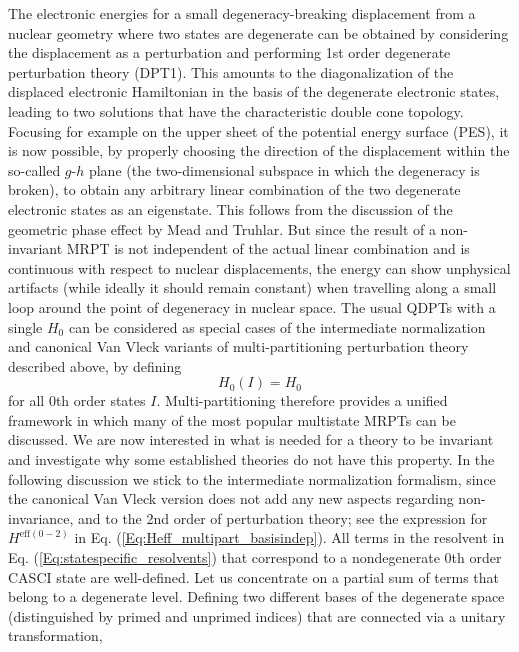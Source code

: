  The electronic energies for a small degeneracy-breaking displacement from a nuclear geometry where two states are degenerate can be obtained by considering the displacement as a perturbation and performing 1st order degenerate perturbation theory (DPT1). This amounts to the diagonalization of the displaced electronic Hamiltonian in the basis of the degenerate electronic states, leading to two solutions that have the characteristic double cone topology. Focusing for example on the upper sheet of the potential energy surface (PES), it is now possible, by properly choosing the direction of the displacement within the so-called $g$-$h$ plane\cite{Yarko_1998_511} (the two-dimensional subspace in which the degeneracy is broken), to obtain any arbitrary linear combination of the two degenerate electronic states as an eigenstate. This follows from the discussion of the geometric phase effect by Mead and Truhlar.\cite{MeadT_1979_2284} But since the result of a non-invariant MRPT is not independent of the actual linear combination and is continuous with respect to nuclear displacements, the energy can show unphysical artifacts (while ideally it should remain constant) when travelling along a small loop around the point of degeneracy in nuclear space.
The usual QDPTs with a single ${H_0}$ can be considered as special cases of the intermediate normalization and canonical Van Vleck variants of multi-partitioning perturbation theory described above, by defining
	\begin{equation}
	{H_0}(I) = {H_0}
	\end{equation}
for all 0th order states $I$. Multi-partitioning therefore provides a unified framework in which many of the most popular multistate MRPTs can be discussed. We are now interested in what is needed for a theory to be invariant and investigate why some established theories do not have this property. In the following discussion we stick to the intermediate normalization formalism, since the canonical Van Vleck version does not add any new aspects regarding non-invariance, and to the 2nd order of perturbation theory; see the expression for ${H^{{\text{eff}}(0 - 2)}}$ in Eq. (\ref{Eq:Heff_multipart_basisindep}).
All terms in the resolvent in Eq. (\ref{Eq:statespecific_resolvents}) that correspond to a nondegenerate 0th order CASCI state are well-defined. Let us concentrate on a partial sum of terms that belong to a degenerate level. Defining two different bases of the degenerate space (distinguished by primed and unprimed indices) that are connected via a unitary transformation,
